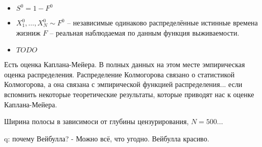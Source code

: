 \documentclass[main.tex]{subfiles}
\begin{document}
\begin{itemize}[noitemsep]
	\item $ S^0 = 1 - F^0 $
	\item $ X_1^0, \dots, X_N^0 \sim F^0 $ -- независимые одинаково распределённые истинные времена жизниж $ F $ -- реальная наблюдаемая по данным функция выживаемости. 
	\item $ TODO  $
\end{itemize}

Есть оценка Каплана-Мейера.
В полных данных на этом месте эмпирическая оценка распределения.
Распределение Колмогорова связано о статистикой Колмогорова, а она связана с эмпирической функцией распределения...
если вспомнить некоторые теоретические результаты, которые приводят нас к оценке Каплана-Мейера.

Ширина полосы в зависимоси от глубины цензурирования, $ N=500 $...

q: почему Вейбулла?
- Можно всё, что угодно.
Вейбулла красиво.
\end{document}
